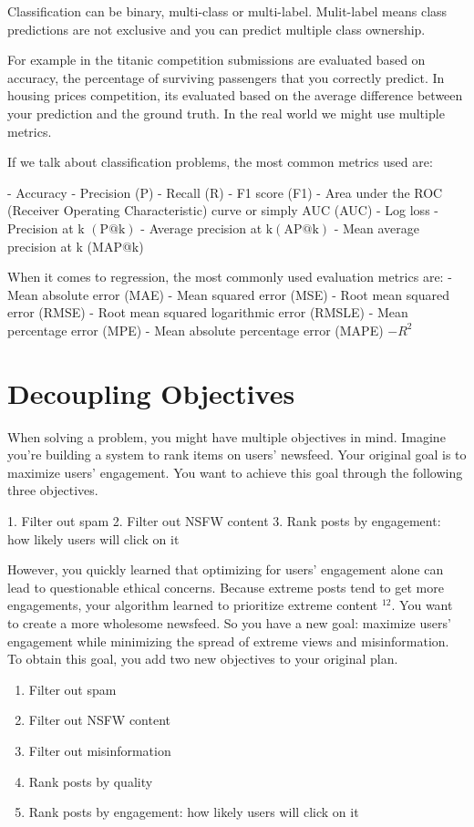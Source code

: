 \documentclass[openany]{book}
\begin{document}
Classification can be binary, multi-class or multi-label. Mulit-label means class predictions are not exclusive and you can predict multiple class ownership. 

For example in the titanic competition submissions are evaluated based on accuracy, the percentage of surviving passengers that you correctly predict. In housing prices competition, its evaluated based on the average difference between your prediction and the ground truth. In the real world we might use multiple metrics.

If we talk about classification problems, the most common metrics used are:

- Accuracy
- Precision (P)
- Recall (R)
- F1 score (F1)
- Area under the ROC (Receiver Operating Characteristic) curve or simply AUC (AUC)
- Log loss
- Precision at k $(\mathrm{P} @ \mathrm{k})$
- Average precision at $\mathrm{k}(\mathrm{AP} @ \mathrm{k})$
- Mean average precision at k (MAP@k)

When it comes to regression, the most commonly used evaluation metrics are:
- Mean absolute error (MAE)
- Mean squared error (MSE)
- Root mean squared error (RMSE)
- Root mean squared logarithmic error (RMSLE)
- Mean percentage error (MPE)
- Mean absolute percentage error (MAPE)
$-R^2$

\section{Decoupling Objectives}

When solving a problem, you might have multiple objectives in mind. Imagine you're building a system to rank items on users' newsfeed. Your original goal is to maximize users' engagement. You want to achieve this goal through the following three objectives.

1. Filter out spam
2. Filter out NSFW content
3. Rank posts by engagement: how likely users will click on it


However, you quickly learned that optimizing for users' engagement alone can lead to questionable ethical concerns. Because extreme posts tend to get more engagements, your algorithm learned to prioritize extreme content ${ }^{12}$. You want to create a more wholesome newsfeed. So you have a new goal: maximize users' engagement while minimizing the spread of extreme views and misinformation. To obtain this goal, you add two new objectives to your original plan.

\begin{enumerate}
    \item Filter out spam
    \item Filter out NSFW content
    \item Filter out misinformation
    \item Rank posts by quality
    \item Rank posts by engagement: how likely users will click on it
\end{enumerate}
\end{document}
